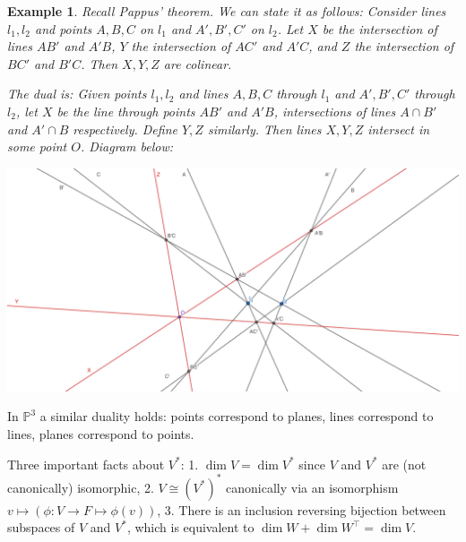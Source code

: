 \documentclass[12pt]{article}
\renewcommand{\P}{\mathbb{P}}
\newtheorem*{example}{Example}
\begin{document}
    \begin{example}
        Recall Pappus' theorem. We can state it as follows: Consider lines $l_1, l_2$ and points $A, B, C$ on $l_1$ and $A', B', C'$ on $l_2$. Let $X$ be the intersection of lines $AB'$ and $A'B$, $Y$ the intersection of $AC'$ and $A'C$, and $Z$ the intersection of $BC'$ and $B'C$. Then $X, Y, Z$ are colinear. \par 
        The dual is: Given points $l_1, l_2$ and lines $A, B, C$ through $l_1$ and $A', B', C'$ through $l_2$, let $X$ be the line through points $AB'$ and $A'B$, intersections of lines $A \cap B'$ and $A' \cap B$ respectively. Define $Y, Z$ similarly. Then lines $X, Y, Z$ intersect in some point $O$. Diagram below: 
        \begin{center}
            \includegraphics[width = \linewidth]{pappus_dual.png}
        \end{center}
    \end{example} 
    In $\P^3$ a similar duality holds: points correspond to planes, lines correspond to lines, planes correspond to points. \par 
    Three important facts about $V^*$: 1. $\dim V = \dim V^*$ since $V$ and $V^*$ are (not canonically) isomorphic, 2. $V \cong (V^*)^*$ canonically via an isomorphism $v \mapsto (\phi: V \to F \mapsto \phi(v))$, 3. There is an inclusion reversing bijection between subspaces of $V$ and $V^*$, which is equivalent to $\dim W + \dim W^\top = \dim V$. 
\end{document}
